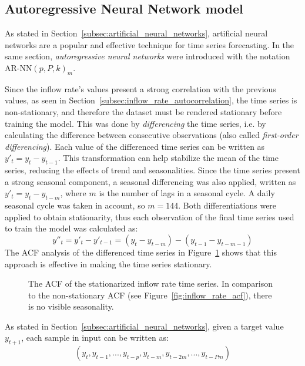 \subsection{Autoregressive Neural Network model}
\label{subsec:artificial_neural_network_model}

As stated in Section~\ref{subsec:artificial_neural_networks}, artificial neural networks are a popular and effective technique for time series forecasting. In the same section, \emph{autoregressive neural networks} were introduced with the notation \( \text{AR-NN}(p, P, k)_m \).

Since the inflow rate's values present a strong correlation with the previous values, as seen in Section~\ref{subsec:inflow_rate_autocorrelation}, the time series is non-stationary, and therefore the dataset must be rendered stationary before training the model. This was done by \emph{differencing} the time series, i.e. by calculating the difference between consecutive observations (also called \emph{first-order differencing}). Each value of the differenced time series can be written as \( y'_t = y_t - y_{t-1} \). This transformation can help stabilize the mean of the time series, reducing the effects of trend and seasonalities. Since the time series present a strong seasonal component, a seasonal differencing was also applied, written as \( y'_t = y_t - y_{t-m} \), where \( m \) is the number of lags in a seasonal cycle. A daily seasonal cycle was taken in account, so \( m = 144 \). Both differentiations were applied to obtain stationarity, thus each observation of the final time series used to train the model was calculated as:
\begin{equation}
  y''_t = y'_t - y'_{t-1} = (y_t - y_{t-m}) - (y_{t-1} - y_{t-m-1})
\end{equation}
The ACF analysis of the differenced time series in Figure~\ref{fig:stationary_inflow_rate_acf} shows that this approach is effective in making the time series stationary.

\begin{figure}
  \begin{center}
  \end{center}
  \caption{The ACF of the stationarized inflow rate time series. In comparison to the non-stationary ACF (see Figure~\ref{fig:inflow_rate_acf}), there is no visible seasonality.}
  \label{fig:stationary_inflow_rate_acf}
\end{figure}

As stated in Section~\ref{subsec:artificial_neural_networks}, given a target value \( y_{t+1} \), each sample in input can be written as:
\[
  (y_{t}, y_{t-1}, ..., y_{t-p}, y_{t-m}, y_{t-2m}, ..., y_{t-Pm})
\]

